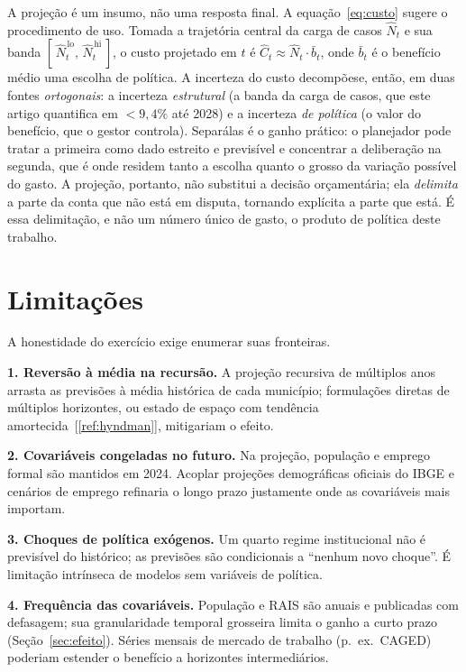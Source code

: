 \documentclass[12pt,a4paper,oneside]{article}
\newcommand{\C}[1]{[\ref{#1}]}
\begin{document}
A projeção é um insumo, não uma resposta final. A equação~\eqref{eq:custo}
sugere o procedimento de uso. Tomada a trajetória central da carga de
casos $\widehat{N}_t$ e sua banda
$[\,\widehat{N}_t^{\,\text{lo}},\,\widehat{N}_t^{\,\text{hi}}\,]$, o custo
projetado em $t$ é $\widehat{C}_t\approx \widehat{N}_t\cdot \bar{b}_t$, onde
$\bar{b}_t$ é o benefício médio \textemdash{} uma escolha de política. A
incerteza do custo decompõe\-se, então, em duas fontes \emph{ortogonais}: a
incerteza \emph{estrutural} (a banda da carga de casos, que este artigo
quantifica em ${<}9{,}4\%$ até 2028) e a incerteza \emph{de política} (o
valor do benefício, que o gestor controla). Separá\-las é o ganho
prático: o planejador pode tratar a primeira como dado \textemdash{}
estreito e previsível \textemdash{} e concentrar a deliberação na segunda,
que é onde residem tanto a escolha quanto o grosso da variação possível do
gasto. A projeção, portanto, não substitui a decisão orçamentária; ela
\emph{delimita} a parte da conta que não está em disputa, tornando
explícita a parte que está. É essa delimitação, e não um número único de
gasto, o produto de política deste trabalho.

\section{Limitações}
\label{sec:limitacoes}

A honestidade do exercício exige enumerar suas fronteiras.

\textbf{1. Reversão à média na recursão.} A projeção recursiva de múltiplos
anos arrasta as previsões à média histórica de cada município; formulações
diretas de múltiplos horizontes, ou estado de espaço com tendência
amortecida~\C{ref:hyndman}, mitigariam o efeito.

\textbf{2. Covariáveis congeladas no futuro.} Na projeção, população e
emprego formal são mantidos em 2024. Acoplar projeções demográficas
oficiais do IBGE e cenários de emprego refinaria o longo prazo
\textemdash{} justamente onde as covariáveis mais importam.

\textbf{3. Choques de política exógenos.} Um quarto regime institucional
não é previsível do histórico; as previsões são condicionais a ``nenhum
novo choque''. É limitação intrínseca de modelos sem variáveis de política.

\textbf{4. Frequência das covariáveis.} População e RAIS são anuais e
publicadas com defasagem; sua granularidade temporal grosseira limita o
ganho a curto prazo (Seção~\ref{sec:efeito}). Séries mensais de mercado de
trabalho (p.\ ex.\ CAGED) poderiam estender o benefício a horizontes
intermediários.
\end{document}
